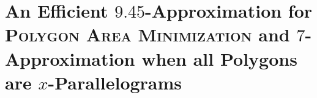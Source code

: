 \documentclass[a4paper,UKenglish,cleveref, autoref, thm-restate]{lipics_v2021}
\DeclareMathOperator{\opt}{opt}
\DeclareMathOperator{\area}{\mathtt{area}}
\DeclareMathOperator{\N}{\mathbb{N}}
\begin{document}


\section{An Efficient $9.45$-Approximation for \textsc{Polygon Area Minimization} and $7$-Approximation when all Polygons are $x$-Parallelograms}
\label{section_polygon_area_min}
\end{document}
